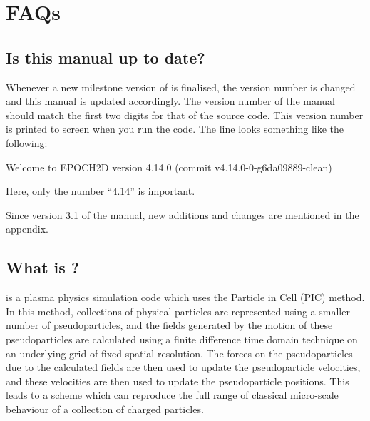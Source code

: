 


%

{
  \selectfont
}
\selectfont%
\tableofcontents%
\newpage%
\DefineShortVerb{\#}

\section{FAQs}

\subsection{Is this manual up to date?}

Whenever a new milestone version of {\EPOCH} is finalised, the version
number is changed and this manual is updated accordingly. The version number
of the manual should match the first two digits for that of the {\EPOCH}
source code.
This version number is printed to screen when you run the code. The line looks
something like the following:
\begin{boxverbatim}
 Welcome to EPOCH2D version 4.14.0   (commit v4.14.0-0-g6da09889-clean)
\end{boxverbatim}
Here, only the number ``4.14'' is important.

Since version 3.1 of the manual, new additions and changes are mentioned
in the appendix.

\subsection{What is {\EPOCH}?}

{\EPOCH} is a plasma physics simulation code which uses the Particle in Cell
(PIC) method. In this method, collections of physical particles are represented
using a smaller number of pseudoparticles, and the fields generated by the
motion of these pseudoparticles are calculated using a finite difference time
domain technique on an underlying grid of fixed spatial resolution. The forces
on the pseudoparticles due to the calculated fields are then used to update the
pseudoparticle velocities, and these velocities are then used to update the
pseudoparticle positions. This leads to a scheme which can reproduce the full
range of classical micro-scale behaviour of a collection of charged
particles.

